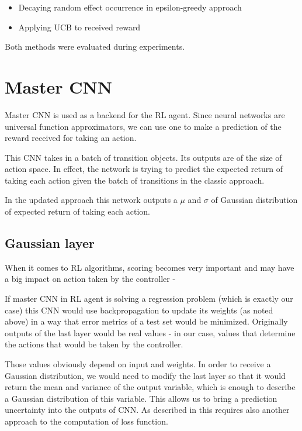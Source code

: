 \begin{itemize}
\item Decaying random effect occurrence in epsilon-greedy approach 
\item Applying UCB to received reward
\end{itemize}

Both methods were evaluated during experiments.

\section{Master CNN}

Master CNN is used as a backend for the RL agent. Since neural networks are universal function approximators, we can use one to make a prediction of the reward received for taking an action.

This CNN takes in a batch of transition objects. Its outputs are of the size of action space. In effect, the network is trying to predict the expected return of taking each action given the batch of transitions in the classic approach.

In the updated approach this network outputs a $\mu$ and $\sigma$ of Gaussian distribution of expected return of taking each action.

\subsection{Gaussian layer}

When it comes to RL algorithms, scoring becomes very important and may have a big impact on action taken by the controller - \cite[see][]{tilmann}

If master CNN in RL agent is solving a regression problem (which is exactly our case) this CNN would use backpropagation to update its weights (as noted above) in a way that error metrics of a test set would be minimized. Originally outputs of the last layer would be real values - in our case, values that determine the actions that would be taken by the controller.

Those values obviously depend on input and weights. In order to receive a Gaussian distribution, we would need to modify the last layer so that it would return the mean and variance of the output variable, which is enough to describe a Gaussian distribution of this variable. This allows us to bring a prediction uncertainty into the outputs of CNN. As described in \cite{2017arXiv170404110S} this requires also another approach to the computation of loss function.

